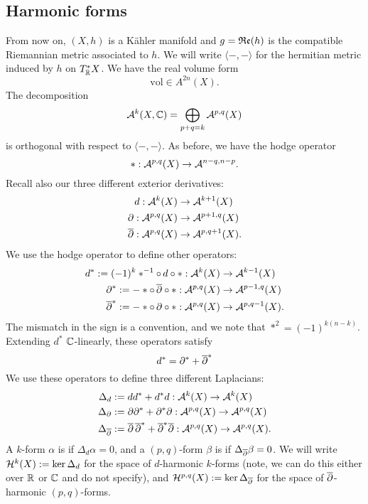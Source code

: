 \subsection{Harmonic forms}
From now on, $(X,h)$ is a Kähler manifold and $g=\mathfrak{R}\mathfrak{e}(h)$ is the compatible Riemannian metric associated to $h$. We will write $\langle -,-\rangle$ for the hermitian metric induced by $h$ on $T^*_\mathbb R X$. We have the real volume form
\[
\text{vol}\in A^{2n}(X).
\]
%
The decomposition
%
\[
\mathcal{A}^k(X,\mathbb C)=\bigoplus _{p+q=k}\mathcal{A}^{p,q}(X)
\]	
is orthogonal with respect to $\langle-,-\rangle$.  As before, we have the hodge operator
%
\[
*:\mathcal{A}^{p,q}(X)\to \mathcal{A}^{n-q,n-p}.
\]
Recall also our three different exterior derivatives:
\begin{align*}
	d:\mathcal{A}^k(X)&\to \mathcal{A}^{k+1}(X)\\
	\partial:\mathcal{A}^{p,q}(X)&\to \mathcal{A}^{p+1,q}(X)\\
	\overline\partial:\mathcal{A}^{p,q}(X)&\to\mathcal{A}^{p,q+1}(X).
\end{align*}	
%
We use the hodge operator to define other operators:
\begin{align*}
	d^*:=(-1)^k*^{-1}\circ\, d\circ*:\mathcal{A}^k(X)&\to \mathcal{A}^{k-1}(X)\\
	\partial^*:=-*\circ\,\overline\partial\circ*:\mathcal{A}^{p,q}(X)&\to \mathcal{A}^{p-1,q}(X)\\
		\overline\partial^*:=-*\circ\,\partial\circ*:\mathcal{A}^{p,q}(X)&\to \mathcal{A}^{p,q-1}(X).
\end{align*}	
%
The mismatch in the sign is a convention, and we note that $*^2=(-1)^{k(n-k)}$. Extending $d^*$ $\mathbb C$-linearly, these operators satisfy
%
\[
d^*=\partial^*+{\overline\partial}^*
\]
%
We use these operators to define three different Laplacians:
%
\begin{align*}
	\Delta_d&:=dd^*+d^*d:\mathcal{A}^k(X)\to\mathcal{A}^k(X)\\
	\Delta_\partial&:=\partial\partial^*+\partial^*\partial:\mathcal{A}^{p,q}(X)\to \mathcal{A}^{p,q}(X)\\
	\Delta_{\overline\partial}&:={\overline\partial}\,{\overline\partial}^*+{\overline\partial}^*{\overline\partial}:\mathcal{A}^{p,q}(X)\to \mathcal{A}^{p,q}(X).
\end{align*}
%
A $k$-form $\alpha$ is  if $\Delta_d\alpha=0$, and a $(p,q)$-form $\beta$ is  if $\Delta_{{\overline\partial}}\beta=0$. We will write $\mathcal{H}^k(X):=\ker\Delta_d$ for the space of $d$-harmonic $k$-forms (note, we can do this either over $\mathbb R$ or $\mathbb C$ and do not specify), and $\mathcal{H}^{p,q}(X):=\ker\Delta_{\overline\partial}$ for the space of ${\overline\partial}$-harmonic $(p,q)$-forms. 

